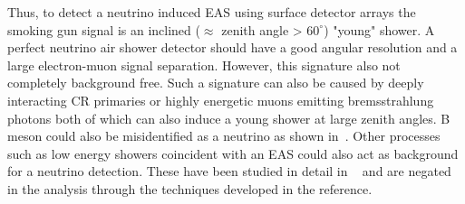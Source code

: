 Thus, to detect a neutrino induced EAS using surface detector arrays the smoking gun signal is an inclined ($\approx$ zenith angle > $60^{\circ}$) "young" shower. A perfect neutrino air shower detector should have a good angular resolution and a large electron-muon signal separation. However, this signature also not completely background free. Such a signature can also be caused by deeply interacting CR primaries or highly energetic muons emitting bremsstrahlung photons both of which can also induce a young shower at large zenith angles. B meson could also be misidentified as a neutrino as shown in~\cite{article_b_MESONS}. Other processes such as low energy showers coincident with an EAS could also act as background for a neutrino detection. These have been studied in detail in ~\cite{gap_note_2013} and are negated in the analysis through the techniques developed in the reference. 
